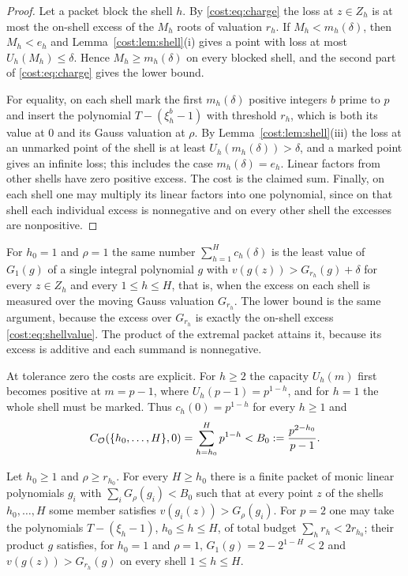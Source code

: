 \begin{proof}
Let a packet block the shell $h$. By \eqref{cost:eq:charge} the loss at $z\in Z_h$ is at
most the on-shell excess of the $M_h$ roots of valuation $r_h$. If $M_h<m_h(\delta)$, then
$M_h<e_h$ and Lemma~\ref{cost:lem:shell}(i) gives a point with loss at most
$U_h(M_h)\le\delta$. Hence $M_h\ge m_h(\delta)$ on every blocked shell, and the second part
of \eqref{cost:eq:charge} gives the lower bound.

For equality, on each shell mark the first $m_h(\delta)$ positive integers $b$ prime to
$p$ and insert the polynomial $T-(\xi_h^b-1)$ with threshold $r_h$, which is both its value
at $0$ and its Gauss valuation at $\rho$. By Lemma~\ref{cost:lem:shell}(iii) the loss at an
unmarked point of the shell is at least $U_h(m_h(\delta))>\delta$, and a marked point gives
an infinite loss; this includes the case $m_h(\delta)=e_h$. Linear factors from other
shells have zero positive excess. The cost is the claimed sum. Finally, on each shell one
may multiply its linear factors into one polynomial, since on that shell each individual
excess is nonnegative and on every other shell the excesses are nonpositive.
\end{proof}

\begin{remark}\label{cost:rem:moving}
For $h_0=1$ and $\rho=1$ the same number $\sum_{h=1}^Hc_h(\delta)$ is the least value of
$G_1(g)$ of a single integral polynomial $g$ with
$v(g(z))>G_{r_h}(g)+\delta$ for every $z\in Z_h$ and every $1\le h\le H$, that is, when the
excess on each shell is measured over the moving Gauss valuation $G_{r_h}$. The lower bound
is the same argument, because the excess over $G_{r_h}$ is exactly the on-shell excess
\eqref{cost:eq:shellvalue}. The product of the extremal packet attains it, because its
excess is additive and each summand is nonnegative.
\end{remark}

At tolerance zero the costs are explicit. For $h\ge2$ the capacity $U_h(m)$ first becomes
positive at $m=p-1$, where $U_h(p-1)=p^{1-h}$, and for $h=1$ the whole shell must be
marked. Thus $c_h(0)=p^{1-h}$ for every $h\ge1$ and
\begin{equation}\label{cost:eq:zerotol}
 C_{\mathcal{O}}(\{h_0,\ldots,H\},0)=\sum_{h=h_0}^Hp^{1-h}<B_0:=\frac{p^{2-h_0}}{p-1}.
\end{equation}

\begin{corollary}\label{cost:cor:individual}
Let $h_0\ge1$ and $\rho\ge r_{h_0}$. For every $H\ge h_0$ there is a finite packet of monic
linear polynomials $g_i$ with $\sum_iG_\rho(g_i)<B_0$ such that at every point $z$ of the
shells $h_0,\ldots,H$ some member satisfies $v(g_i(z))>G_\rho(g_i)$. For $p=2$ one may take the polynomials $T-(\xi_h-1)$,
$h_0\le h\le H$, of total budget $\sum_hr_h<2r_{h_0}$; their product $g$ satisfies, for
$h_0=1$ and $\rho=1$, $G_1(g)=2-2^{1-H}<2$ and $v(g(z))>G_{r_h}(g)$ on every shell
$1\le h\le H$.
\end{corollary}

